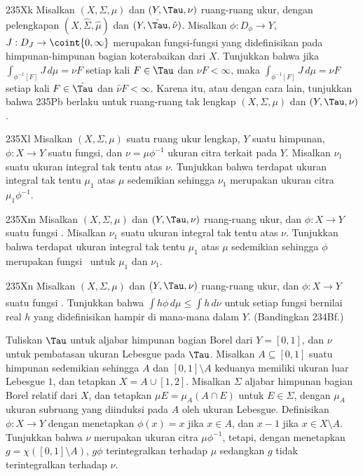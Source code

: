 {\spheader 235Xk Misalkan $(X,\Sigma,\mu)$ dan $(Y,\Tau,\nu)$
ruang-ruang ukur, dengan pelengkapan $(X,\hat\Sigma,\hat\mu)$ dan
$(Y,\hat\Tau,\hat\nu)$. Misalkan $\phi:D_{\phi}\to Y$,
$J:D_J\to \coint{0,\infty}$ merupakan fungsi-fungsi yang didefinisikan
pada himpunan-himpunan bagian koterabaikan dari $X$. Tunjukkan bahwa
jika $\int_{\phi^{-1}[F]}J\,d\mu=\nu F$ setiap kali $F\in\Tau$ dan
$\nu F<\infty$, maka $\int_{\phi^{-1}[F]}J\,d\mu=\nu F$ setiap kali
$F\in\hat\Tau$ dan $\hat\nu F<\infty$. Karena itu, atau dengan cara
lain, tunjukkan bahwa 235Pb berlaku untuk ruang-ruang tak lengkap
$(X,\Sigma,\mu)$ dan $(Y,\Tau,\nu)$.

\spheader 235Xl Misalkan $(X,\Sigma,\mu)$ suatu ruang ukur lengkap,
$Y$ suatu himpunan, $\phi:X\to Y$ suatu fungsi, dan
$\nu=\mu\phi^{-1}$ ukuran citra terkait pada $Y$. Misalkan $\nu_1$
suatu ukuran integral tak tentu atas $\nu$. Tunjukkan bahwa terdapat
ukuran integral tak tentu $\mu_1$ atas $\mu$ sedemikian sehingga
$\nu_1$ merupakan ukuran citra $\mu_1\phi^{-1}$.

\spheader 235Xm
 Misalkan $(X,\Sigma,\mu)$ dan $(Y,\Tau,\nu)$ ruang-ruang ukur,
dan $\phi:X\to Y$ suatu fungsi \imp.
Misalkan $\nu_1$ suatu
ukuran integral tak tentu atas $\nu$. Tunjukkan bahwa terdapat
ukuran integral tak tentu $\mu_1$ atas $\mu$ sedemikian sehingga $\phi$
merupakan fungsi \imp\  untuk $\mu_1$ dan $\nu_1$.

\spheader 235Xn
Misalkan $(X,\Sigma,\mu)$ dan $(Y,\Tau,\nu)$
ruang-ruang ukur, dan $\phi:X\to Y$ suatu fungsi \imp. Tunjukkan bahwa
$\overline{\int}h\phi\,d\mu\le\overline{\int}h\,d\nu$ untuk setiap
fungsi bernilai real $h$ yang didefinisikan hampir di mana-mana dalam
$Y$.
(Bandingkan 234Bf.)

Tuliskan $\Tau$ untuk aljabar himpunan bagian Borel dari
$Y=[0,1]$, dan $\nu$ untuk pembatasan ukuran Lebesgue pada $\Tau$.
Misalkan $A\subseteq[0,1]$ suatu himpunan sedemikian sehingga $A$ dan
$[0,1]\setminus A$ keduanya memiliki ukuran luar Lebesgue $1$, dan
tetapkan $X=A\cup[1,2]$. Misalkan $\Sigma$ aljabar himpunan bagian Borel
relatif dari $X$, dan tetapkan $\mu E=\mu_A(A\cap E)$ untuk
$E\in\Sigma$, dengan $\mu_A$ ukuran subruang yang diinduksi pada $A$
oleh ukuran Lebesgue. Definisikan $\phi:X\to Y$ dengan menetapkan
$\phi(x)=x$ jika $x\in A$, dan $x-1$ jika $x\in X\setminus A$.
Tunjukkan bahwa $\nu$ merupakan ukuran citra $\mu\phi^{-1}$, tetapi,
dengan menetapkan $g=\chi([0,1]\setminus A)$, $g\phi$ terintegralkan
terhadap $\mu$ sedangkan $g$ tidak terintegralkan terhadap $\nu$.

}
